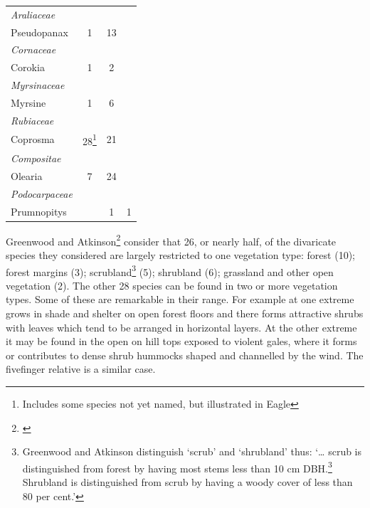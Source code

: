 \begin{xltabular}{\textwidth}{ X c c c }
	\emph{Araliaceae} \\
	\hspace{3mm}Pseudopanax & 1 & 13 \\
	\emph{Cornaceae} \\
	\hspace{3mm}Corokia & 1 & 2 \\
	\emph{Myrsinaceae} \\
	\hspace{3mm}Myrsine & 1 & 6 \\
	\emph{Rubiaceae} \\
	\hspace{3mm}Coprosma
	& 28\footnote{Includes some species not yet named, but illustrated in Eagle}
	& 21 \\
	\emph{Compositae} \\
	\hspace{3mm}Olearia & 7 & 24 \\
	\emph{Podocarpaceae} \\
	\hspace{3mm}Prumnopitys &  & 1 & 1 \\
	\bottomrule
\end{xltabular}

Greenwood and Atkinson\footnote{\cite{greenwood1977evolution}} consider that 26, or nearly half, of the divaricate species they considered are largely restricted to one vegetation type: forest (10); forest margins (3); scrubland\footnote{Greenwood and Atkinson distinguish `scrub' and `shrubland' thus: `… scrub is distinguished from forest by having most stems less than 10 cm DBH.\footnote{DBH:\@Diameter at breast height, typically 1.3m above ground.} Shrubland is distinguished from scrub by having a woody cover of less than 80 per cent.'} (5); shrubland (6); grassland and other open vegetation (2).
The other 28 species can be found in two or more vegetation types.
Some of these are remarkable in their range.
For example  at one extreme grows in shade and shelter on open forest floors and there forms attractive shrubs with leaves which tend to be arranged in horizontal layers.
At the other extreme it may be found in the open on hill tops exposed to violent gales, where it forms or contributes to dense shrub hummocks shaped and channelled by the wind.
The fivefinger relative  is a similar case.

